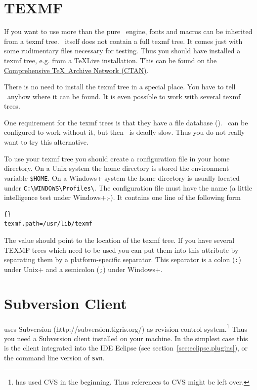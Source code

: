 \section{TEXMF}

If you want to use more than the pure \ExTeX\ engine, fonts and macros
can be inherited from a texmf tree. \ExTeX\ itself does
not contain a full texmf tree. It comes just with some rudimentary
files necessary for testing. Thus you should have installed a texmf
tree, e.g. from a \TeX Live installation.
This can be found on the \href{http://www.ctan.org}{Comprehensive
  \TeX\ Archive Network (CTAN)}.

There is no need to install the texmf tree in a special place. You
have to tell \ExTeX\ anyhow where it can be found. It is even possible
to work with several texmf trees.

One requirement for the texmf trees is that they have a file database
(). \ExTeX\ can be configured to work without it, but then
\ExTeX\ is deadly slow. Thus you do not really want to try this
alternative.

To use your texmf tree you should create a configuration file in your
home directory. On a Unix system the home directory is
stored the environment variable
\verb|$HOME|. On a \+Windows+ system the
home directory is usually located under \verb|C:\WINDOWS\Profiles\|.
The configuration file must have the name  (a little
intelligence test under \+Windows+;-). It contains one line of the
following form

\begin{lstlisting}{}
texmf.path=/usr/lib/texmf
\end{lstlisting}

The value should point to the location of the texmf tree. If you have
several TEXMF trees which need to be used you can put them into this
attribute by separating them by a platform-specific separator. This
separator is a colon (\verb|:|) under \+Unix+ and a semicolon
(\verb|;|) under \+Windows+. 

\section{Subversion Client}

\ExTeX{} uses Subversion (\url{http://subversion.tigris.org/}) as
revision control system.\footnote{\ExTeX{} has used CVS in
  the beginning. Thus references to CVS might be left over.} Thus you
need a Subversion client installed on your machine. In the simplest
case this is the client integrated into the IDE Eclipse (see
section~\ref{sec:eclipse.plugins}), or the command line version of
\texttt{svn}.

